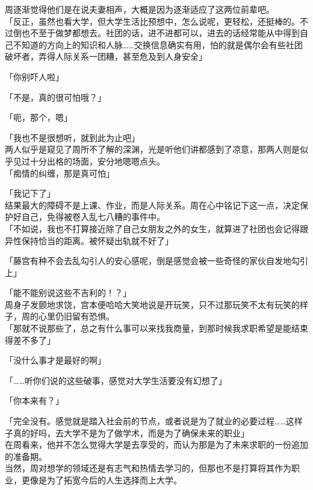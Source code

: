 周逐渐觉得他们是在说夫妻相声，大概是因为逐渐适应了这两位前辈吧。\\

「反正，虽然也看大学，但大学生活比预想中，怎么说呢，更轻松，还挺棒的。不过倒也不至于做梦都想去。社团的话，进不进都可以，进去的话经常能从中得到自己不知道的方向上的知识和人脉……交换信息确实有用，怕的就是偶尔会有些社团破坏者，弄得人际关系一团糟，甚至危及到人身安全」

「你别吓人啦」

「不是，真的很可怕哦？」

「呃，那个，嗯」

「我也不是很想听，就到此为止吧」\\

两人似乎是窥见了周所不了解的深渊，光是听他们讲都感到了凉意，那两人则是似乎见过十分出格的场面，安分地嗯嗯点头。\\

「痴情的纠缠，那是真可怕」

「我记下了」\\

结果最大的障碍不是上课、作业，而是人际关系。周在心中铭记下这一点，决定保护好自己，免得被卷入乱七八糟的事件中。\\

「不如说，我也不打算接近除了自己女朋友之外的女生，就算进了社团也会记得跟异性保持恰当的距离。被怀疑出轨就不好了」

「藤宫有种不会去乱勾引人的安心感呢，倒是感觉会被一些奇怪的家伙自发地勾引上」

「能不能别说这些不吉利的！？」\\

周身子发颤地求饶，宫本便哈哈大笑地说是开玩笑，只不过那玩笑不太有玩笑的样子，周的心里仍旧留有恐惧。\\

「那就不说那些了，总之有什么事可以来找我商量，到那时候我求职希望是能结束得差不多了」

「没什么事才是最好的啊」

「……听你们说的这些破事，感觉对大学生活要没有幻想了」

「你本来有？」

「完全没有。感觉就是踏入社会前的节点，或者说是为了就业的必要过程……这样子真的好吗，去大学不是为了做学术，而是为了确保未来的职业」\\

在周看来，他并不怎么觉得大学是去享受的，而认为那是为了未来求职的一份追加的准备期。\\

当然，周对想学的领域还是有志气和热情去学习的，但那也不是打算将其作为职业，更像是为了拓宽今后的人生选择而上大学。\\

